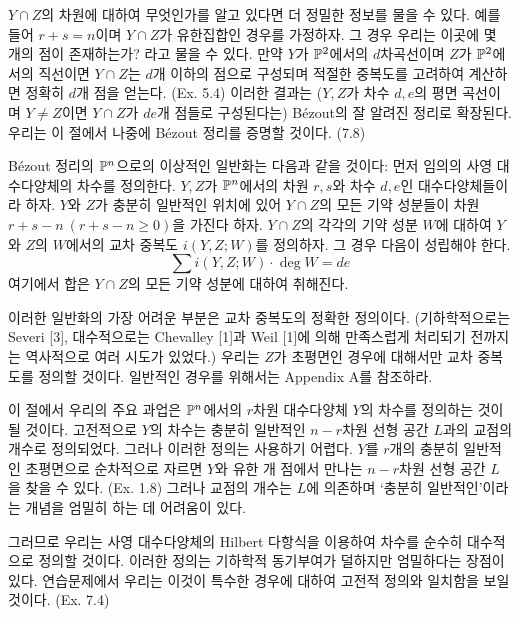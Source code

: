 	$Y\cap Z$의 차원에 대하여 무엇인가를 알고 있다면 더 정밀한 정보를 물을 수 있다.
	예를 들어 $r+s=n$이며 $Y\cap Z$가 유한집합인 경우를 가정하자. 그 경우 우리는 이곳에 몇 개의 점이 존재하는가? 라고 물을 수 있다.
	만약 $Y$가 $\mathbb{P}^2$에서의 $d$차곡선이며 $Z$가 $\mathbb{P}^2$에서의 직선이면 $Y\cap Z$는 $d$개 이하의 점으로 구성되며
	적절한 중복도를 고려하여 계산하면 정확히 $d$개 점을 얻는다. (Ex. 5.4)
	이러한 결과는 ($Y,Z$가 차수 $d,e$의 평면 곡선이며 $Y\ne Z$이면 $Y\cap Z$가 $de$개 점들로 구성된다는)
	B\'ezout의 잘 알려진 정리로 확장된다.
	우리는 이 절에서 나중에 B\'ezout 정리를 증명할 것이다. (7.8)
	
	B\'ezout 정리의 $\mathbb{P}^n$으로의 이상적인 일반화는 다음과 같을 것이다:
	먼저 임의의 사영 대수다양체의 차수를 정의한다. $Y,Z$가 $\mathbb{P}^n$에서의 차원 $r,s$와 차수 $d,e$인 대수다양체들이라 하자.
	$Y$와 $Z$가 충분히 일반적인 위치에 있어 $Y\cap Z$의 모든 기약 성분들이 차원 $r+s-n\:(r+s-n\ge 0)$을 가진다 하자.
	$Y\cap Z$의 각각의 기약 성분 $W$에 대하여 $Y$와 $Z$의 $W$에서의 교차 중복도 $i(Y,Z;W)$를 정의하자.
	그 경우 다음이 성립해야 한다.
	$$\sum i(Y,Z;W)\cdot\deg W=de$$
	여기에서 합은 $Y\cap Z$의 모든 기약 성분에 대하여 취해진다.
	
	이러한 일반화의 가장 어려운 부분은 교차 중복도의 정확한 정의이다.
	(기하학적으로는 Severi [3], 대수적으로는 Chevalley [1]과 Weil [1]에 의해 만족스럽게 처리되기 전까지는
	역사적으로 여러 시도가 있었다.)
	우리는 $Z$가 초평면인 경우에 대해서만 교차 중복도를 정의할 것이다. 일반적인 경우를 위해서는 Appendix A를 참조하라.
	
	이 절에서 우리의 주요 과업은 $\mathbb{P}^n$에서의 $r$차원 대수다양체 $Y$의 차수를 정의하는 것이 될 것이다.
	고전적으로 $Y$의 차수는 충분히 일반적인 $n-r$차원 선형 공간 $L$과의 교점의 개수로 정의되었다. 그러나 이러한 정의는 사용하기 어렵다.
	$Y$를 $r$개의 충분히 일반적인 초평면으로 순차적으로 자르면 $Y$와 유한 개 점에서 만나는 $n-r$차원 선형 공간 $L$을 찾을 수 있다.
	(Ex. 1.8) 그러나 교점의 개수는 $L$에 의존하며 `충분히 일반적인'이라는 개념을 엄밀히 하는 데 어려움이 있다.
	
	그러므로 우리는 사영 대수다양체의 Hilbert 다항식을 이용하여 차수를 순수히 대수적으로 정의할 것이다.
	이러한 정의는 기하학적 동기부여가 덜하지만 엄밀하다는 장점이 있다.
	연습문제에서 우리는 이것이 특수한 경우에 대하여 고전적 정의와 일치함을 보일 것이다. (Ex. 7.4)
	

